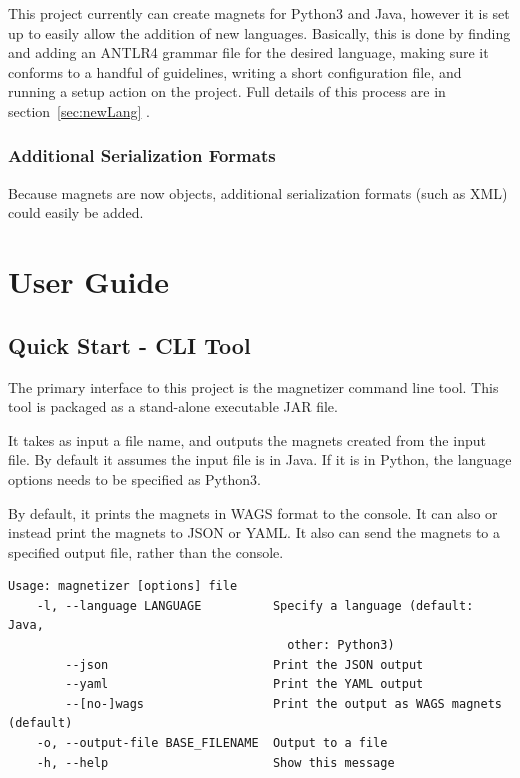 \documentclass[letter,10pt]{article}
\begin{document}
This project currently can create magnets for Python3 and Java, however 
it is set up to easily allow the addition of new languages. 
Basically, this is done by finding and adding an ANTLR4 grammar file 
for the desired language, making sure it conforms to a handful of 
guidelines, writing a short configuration file, and running a setup 
action on the project. Full details of this process are in 
section~\ref{sec:newLang} .


\subsubsection{Additional Serialization Formats}

Because magnets are now objects, additional serialization formats (such 
as XML) could easily be added. 



\section{User Guide}

\subsection{Quick Start - CLI Tool}

The primary interface to this project is the magnetizer command line 
tool.  This tool is packaged as a stand-alone executable JAR file. 

It takes as input a file name, and outputs the magnets created 
from the input file. By default it assumes the input file is in Java. 
If it is in Python, the language options needs to be specified as 
Python3. 

By default, it prints the magnets in WAGS format to the console. It can 
also or instead print the magnets to JSON or YAML. It also can 
send the magnets to a specified output file, rather than the console. 

\begin{verbatim}
Usage: magnetizer [options] file
    -l, --language LANGUAGE          Specify a language (default: Java, 
                                       other: Python3)
        --json                       Print the JSON output
        --yaml                       Print the YAML output
        --[no-]wags                  Print the output as WAGS magnets 
(default)
    -o, --output-file BASE_FILENAME  Output to a file
    -h, --help                       Show this message
\end{verbatim}
\end{document}
